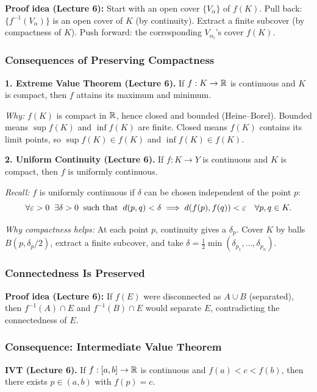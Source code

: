 \documentclass[../master/master.tex]{subfiles}
\begin{document}
\textbf{Proof idea (Lecture 6):} Start with an open cover $\{V_\alpha\}$ of $f(K)$. Pull back: $\{f^{-1}(V_\alpha)\}$ is an open cover of $K$ (by continuity). Extract a finite subcover (by compactness of $K$). Push forward: the corresponding $V_{\alpha_i}$'s cover $f(K)$.

\subsubsection*{Consequences of Preserving Compactness}

\textbf{1. Extreme Value Theorem (Lecture 6).} If $f : K \to \mathbb{R}$ is continuous and $K$ is compact, then $f$ attains its maximum and minimum.

\emph{Why:} $f(K)$ is compact in $\mathbb{R}$, hence closed and bounded (Heine--Borel). Bounded means $\sup f(K)$ and $\inf f(K)$ are finite. Closed means $f(K)$ contains its limit points, so $\sup f(K) \in f(K)$ and $\inf f(K) \in f(K)$.

\textbf{2. Uniform Continuity (Lecture 6).} If $f : K \to Y$ is continuous and $K$ is compact, then $f$ is uniformly continuous.

\emph{Recall:} $f$ is uniformly continuous if $\delta$ can be chosen independent of the point $p$:
\[
\forall \varepsilon > 0\;\; \exists \delta > 0 \;\;\text{such that}\;\; d(p,q) < \delta \implies d(f(p), f(q)) < \varepsilon \quad \forall p, q \in K.
\]

\emph{Why compactness helps:} At each point $p$, continuity gives a $\delta_p$. Cover $K$ by balls $B(p, \delta_p/2)$, extract a finite subcover, and take $\delta = \frac{1}{2}\min(\delta_{p_1}, \ldots, \delta_{p_n})$.

\subsubsection*{Connectedness Is Preserved}

\textbf{Proof idea (Lecture 6):} If $f(E)$ were disconnected as $A \cup B$ (separated), then $f^{-1}(A) \cap E$ and $f^{-1}(B) \cap E$ would separate $E$, contradicting the connectedness of $E$.

\subsubsection*{Consequence: Intermediate Value Theorem}

\textbf{IVT (Lecture 6).} If $f : [a,b] \to \mathbb{R}$ is continuous and $f(a) < c < f(b)$, then there exists $p \in (a,b)$ with $f(p) = c$.
\end{document}
